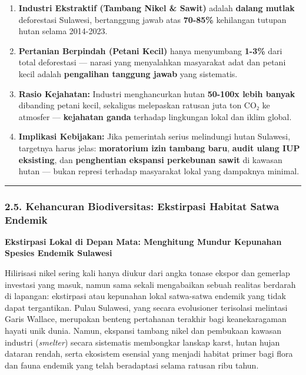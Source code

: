 \documentclass[
]{article}
\providecommand{\tightlist}{%
  \setlength{\itemsep}{0pt}\setlength{\parskip}{0pt}}
\begin{document}
\begin{enumerate}
\def\labelenumi{\arabic{enumi}.}
\tightlist
\item
  \textbf{Industri Ekstraktif (Tambang Nikel \& Sawit)} adalah
  \textbf{dalang mutlak} deforestasi Sulawesi, bertanggung jawab atas
  \textbf{70-85\%} kehilangan tutupan hutan selama 2014-2023.
\item
  \textbf{Pertanian Berpindah (Petani Kecil)} hanya menyumbang
  \textbf{1-3\%} dari total deforestasi --- narasi yang menyalahkan
  masyarakat adat dan petani kecil adalah \textbf{pengalihan tanggung
  jawab} yang sistematis.
\item
  \textbf{Rasio Kejahatan:} Industri menghancurkan hutan \textbf{50-100x
  lebih banyak} dibanding petani kecil, sekaligus melepaskan ratusan
  juta ton CO₂ ke atmosfer --- \textbf{kejahatan ganda} terhadap
  lingkungan lokal dan iklim global.
\item
  \textbf{Implikasi Kebijakan:} Jika pemerintah serius melindungi hutan
  Sulawesi, targetnya harus jelas: \textbf{moratorium izin tambang
  baru}, \textbf{audit ulang IUP eksisting}, dan \textbf{penghentian
  ekspansi perkebunan sawit} di kawasan hutan --- bukan represi terhadap
  masyarakat lokal yang dampaknya minimal.
\end{enumerate}

\begin{center}\rule{0.5\linewidth}{0.5pt}\end{center}

\subsubsection{2.5. Kehancuran Biodiversitas: Ekstirpasi Habitat Satwa
Endemik}\label{kehancuran-biodiversitas-ekstirpasi-habitat-satwa-endemik}

\textbf{Ekstirpasi Lokal di Depan Mata: Menghitung Mundur Kepunahan
Spesies Endemik Sulawesi}

Hilirisasi nikel sering kali hanya diukur dari angka tonase ekspor dan
gemerlap investasi yang masuk, namun sama sekali mengabaikan sebuah
realitas berdarah di lapangan: ekstirpasi atau kepunahan lokal
satwa-satwa endemik yang tidak dapat tergantikan. Pulau Sulawesi, yang
secara evolusioner terisolasi melintasi Garis Wallace, merupakan benteng
pertahanan terakhir bagi keanekaragaman hayati unik dunia. Namun,
ekspansi tambang nikel dan pembukaan kawasan industri (\emph{smelter})
secara sistematis membongkar lanskap karst, hutan hujan dataran rendah,
serta ekosistem esensial yang menjadi habitat primer bagi flora dan
fauna endemik yang telah beradaptasi selama ratusan ribu tahun.
\end{document}
